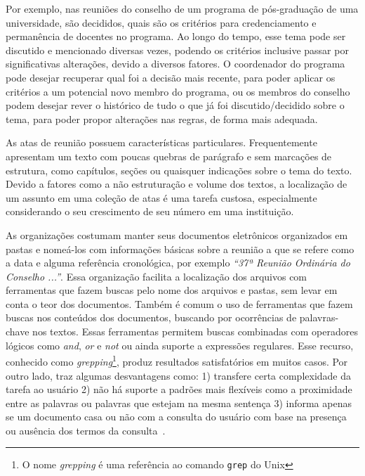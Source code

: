 Por exemplo, nas reuniões do conselho de um programa de pós-graduação de uma universidade, são decididos, quais são os critérios para credenciamento e permanência de docentes no programa. Ao longo do tempo, esse tema pode ser discutido e mencionado diversas vezes, podendo os critérios inclusive passar por significativas alterações, devido a diversos fatores. O coordenador do programa pode desejar recuperar qual foi a decisão mais recente, para poder aplicar os critérios a um potencial novo membro do programa, ou os membros do conselho podem desejar rever o histórico de tudo o que já foi discutido/decidido sobre o tema, para poder propor alterações nas regras, de forma mais adequada.

As atas de reunião possuem características particulares. Frequentemente apresentam um texto com poucas quebras de parágrafo e sem marcações de estrutura, como capítulos, seções ou quaisquer indicações sobre o tema do texto. Devido a fatores como a não estruturação e volume dos textos, a localização de um assunto em uma coleção de atas é uma tarefa custosa, especialmente considerando o seu crescimento de seu número em uma instituição. 


As organizações costumam manter seus documentos eletrônicos organizados em pastas e nomeá-los com informações básicas sobre a reunião a que se refere como a data e alguma referência cronológica, por exemplo \textit{``37ª Reunião Ordinária do Conselho ...''}. Essa organização facilita a localização dos arquivos com ferramentas que fazem buscas pelo nome dos arquivos e pastas, sem levar em conta o teor dos documentos. 
%
Também é comum o uso de ferramentas que fazem buscas nos conteúdos dos documentos, buscando por ocorrências de palavras-chave nos textos. Essas ferramentas permitem buscas combinadas com operadores lógicos como \textit{and}, \textit{or} e \textit{not} ou ainda suporte a expressões regulares. Esse recurso, conhecido como \textit{grepping}\footnote{O nome \textit{grepping} é uma referência ao comando \texttt{grep} do Unix}, produz resultados satisfatórios em muitos casos. Por outro lado, traz algumas desvantagens como: 
1) transfere certa complexidade da tarefa ao usuário 
2) não há suporte a padrões mais flexíveis como a proximidade entre as palavras ou palavras que estejam na mesma sentença 
3) informa apenas se um documento casa ou não com a consulta do usuário com base na presença ou ausência dos termos da consulta~\cite{Aggarwal2012,Manning2008}. 
 

